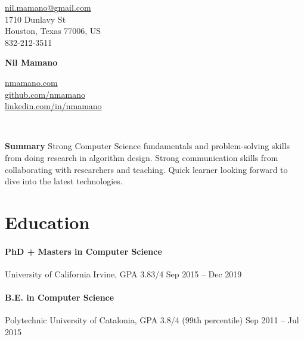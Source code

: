 \documentclass[letterpaper,10pt,oneside]{article}
\begin{document}
{\raggedleft

\begin{minipage}[c]{0.28\textwidth}
	\begin{flushleft}
	\href{mailto:nil.mamano@gmail.com}{nil.mamano@gmail.com}\\
	1710 Dunlavy St\\
	Houston, Texas 77006, US\\
	832-212-3511
	\end{flushleft}
\end{minipage}\hfill
\begin{minipage}[c]{0.3\textwidth}
	\begin{center}
		\Huge{\textbf{Nil Mamano}}
	\end{center}
\end{minipage}\hfill
\begin{minipage}[c]{0.3\textwidth}
	\begin{flushright}
	\href{http://www.nmamano.com}{nmamano.com} \\
	\href{http://www.github.com/nmamano}{github.com/nmamano} \\
	\href{http://www.linkedin.com/in/nmamano}{linkedin.com/in/nmamano}
	\end{flushright}
\end{minipage}\\
\vspace{5px}
\hrulefill
}

\vspace{7px}
\noindent\textbf{Summary} Strong Computer Science fundamentals and problem-solving skills from doing research in algorithm design. Strong communication skills from collaborating with researchers and teaching. Quick learner looking forward to dive into the latest technologies.
\vspace{-12px}
\section*{Education}
\paragraph*{PhD + Masters in Computer Science} University of California Irvine, GPA 3.83/4 \hfill Sep 2015 -- Dec 2019
\paragraph*{B.E. in Computer Science} Polytechnic University of Catalonia, GPA 3.8/4 (99th percentile) \hfill Sep 2011 -- Jul 2015
\vspace*{-1px}
\end{document}
